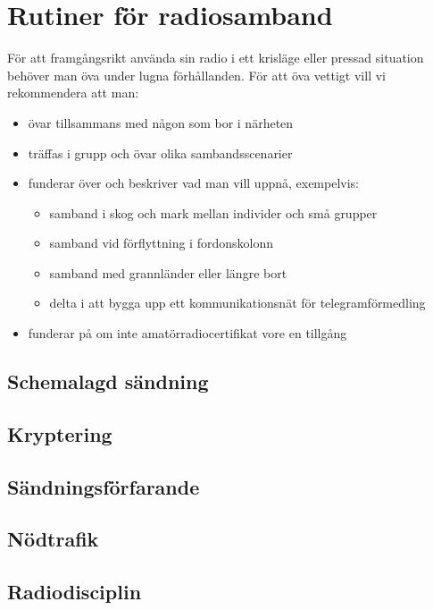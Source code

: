 \chapter{Rutiner för radiosamband}

För att framgångsrikt använda sin radio i ett krisläge eller pressad situation behöver man öva under lugna förhållanden. För att öva vettigt vill vi rekommendera att man:

\begin{itemize}
	\item övar tillsammans med någon som bor i närheten 
	\item träffas i grupp och övar olika sambandsscenarier
	\item funderar över och beskriver vad man vill uppnå, exempelvis:
	\begin{itemize}
		\item samband i skog och mark mellan individer och små grupper
		\item samband vid förflyttning i fordonskolonn
		\item samband med grannländer eller längre bort
		\item delta i att bygga upp ett kommunikationsnät för telegramförmedling
	\end{itemize}
	\item funderar på om inte amatörradiocertifikat vore en tillgång
\end{itemize}

\section{Schemalagd sändning}

\section{Kryptering}

\section{Sändningsförfarande}

\section{Nödtrafik}

\section{Radiodisciplin}
